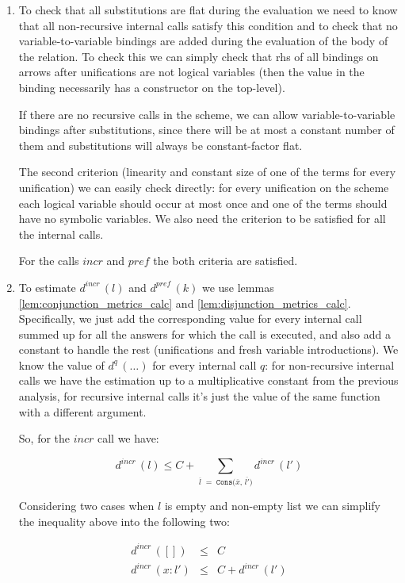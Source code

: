 \begin{enumerate}
\item To check that all substitutions are flat during the evaluation we need to know that all non-recursive internal calls satisfy this condition and to check that no variable-to-variable bindings are added during the evaluation of the body of the relation. To check this we can simply check that rhs of all bindings on arrows after unifications are not logical variables (then the value in the binding
necessarily has a constructor on the top-level).

If there are no recursive calls in the scheme, we can allow variable-to-variable bindings after substitutions, since there will be at most a constant number of them and substitutions will always be constant-factor flat.

The second criterion (linearity and constant size of one of the terms for every unification) we can easily check directly: for every unification on the scheme each logical variable should occur at most once and one of the terms should have no symbolic variables. We also need the criterion to be satisfied for all the internal calls.

For the calls $incr$ and $pref$ the both criteria are satisfied.

\item To estimate $d^{incr}\,(l)$ and $d^{pref}\,(k)$ we use lemmas \ref{lem:conjunction_metrics_calc} and \ref{lem:disjunction_metrics_calc}. Specifically, we just add the corresponding value for every internal call summed up for all the answers for which the call is executed, and also add a constant to handle the rest (unifications and fresh variable introductions). We know the value of $d^q\,(\dots)$ for every internal call $q$: for non-recursive internal calls we have the estimation up to a multiplicative constant from the previous analysis, for recursive internal calls it's just the value of the same function with a different argument.
  
So, for the $incr$ call we have:

\[ d^{incr}\,(l) \le C + \displaystyle\sum\limits_{\overline{l} \;=\; \texttt{Cons($\overline{x}$, $\overline{l'}$)}} d^{incr}\,(l') \]

Considering two cases when $l$ is empty and non-empty list we can simplify the inequality above into the following two:

\[
\begin{array}{lcl}
d^{incr}\,([]) &\le& C \\
d^{incr}\,(x : l') &\le& C + d^{incr}\,(l')
\end{array} \]


\end{enumerate}
